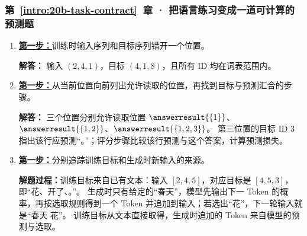 \subsubsection*{第~\ref*{intro:20b-task-contract}~章 · 把语言练习变成一道可计算的预测题}
\begin{enumerate}[label={},leftmargin=4.8em,itemsep=4pt]
\item[\textbf{C-040.}] \leavevmode{}\label{solution:C-040}\label{solution:shifted-token-targets}\hyperref[exercise:shifted-token-targets]{\textbf{第一步：}}训练时输入序列和目标序列错开一个位置。\par\nobreak
\textbf{解答：} 输入 $(2,4,1)$，目标 $(4,1,8)$，且所有 ID 均在词表范围内。
\item[\textbf{C-041.}] \leavevmode{}\label{solution:C-041}\label{solution:causal-target-visibility}\hyperref[exercise:causal-target-visibility]{\textbf{第一步：}}从当前位置向前列出允许读取的位置，再找到目标与预测汇合的步骤。\par\nobreak
\textbf{解答：} 三个位置分别允许读取位置 $\answerresult{\{1\}}$、$\answerresult{\{1,2\}}$、$\answerresult{\{1,2,3\}}$。
第三位置的目标 ID $3$ 指出该行应预测“。”；评分步骤比较该行预测与这个答案，计算预测损失。
\item[\textbf{C-042.}] \leavevmode{}\label{solution:C-042}\label{solution:training-generation-data}\hyperref[exercise:training-generation-data]{\textbf{第一步：}}分别追踪训练目标和生成时新输入的来源。\par\nobreak\textbf{解题过程：}训练目标来自已有文本：输入 $[2,4,5]$，对应目标是 $[4,5,3]$，即“花、开了、。”。
生成时只有给定的“春天”，模型先输出下一 Token 的概率，再按选取规则得到一个 Token 并追加到输入；若选出“花”，下一轮输入就是“春天 花”。
训练目标从文本直接取得，生成时追加的 Token 来自模型的预测与选取。
\end{enumerate}
